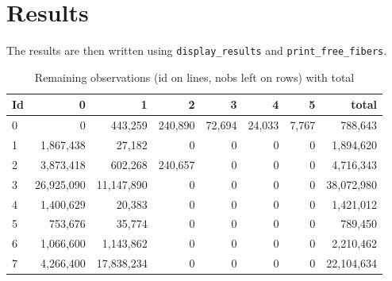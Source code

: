 \documentclass{article}
\begin{document}
\section{Results}
The results are then written using {\tt display\_results} and {\tt print\_free\_fibers}.
 
\begin{table}[h]\begin{center}
\caption{Remaining observations (id on lines, nobs left on rows) with total}\label{tab:full14k}
\begin{tabular}{l|rrrrrrr}
	Id &      0  &           1  &           2  &           3  &           4  &           5  & total\\ \hline
   0  &           0  &     443,259  &     240,890  &      72,694  &      24,033  &       7,767  &     788,643\\
   1  &   1,867,438  &      27,182  &           0  &           0  &           0  &           0  &   1,894,620\\
   2  &   3,873,418  &     602,268  &     240,657  &           0  &           0  &           0  &   4,716,343\\
   3  &  26,925,090  &  11,147,890  &           0  &           0  &           0  &           0  &  38,072,980\\
   4  &   1,400,629  &      20,383  &           0  &           0  &           0  &           0  &   1,421,012\\
   5  &     753,676  &      35,774  &           0  &           0  &           0  &           0  &     789,450\\
   6  &   1,066,600  &   1,143,862  &           0  &           0  &           0  &           0  &   2,210,462\\
   7  &   4,266,400  &  17,838,234  &           0  &           0  &           0  &           0  &  22,104,634\\
\end{tabular}\end{center}
 \end{table}
\end{document}
